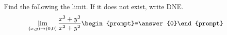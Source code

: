 \documentclass{ximera}
\author{David Guichard \and Neal Koblitz \and H. Jerome Keisler \and Albert Scheller \and Barry Balof \and Mike Wills \and Matthew Carr}
\begin{document}
\begin{exercise}




Find the following the limit. If it does not exist, write DNE. 
\[
\lim_{(x,y)\to (0,0)}\frac{x^3+y^3}{x^2+y^2}\begin{prompt}=\answer{0}\end{prompt}
\]

\end{exercise}
\end{document}
